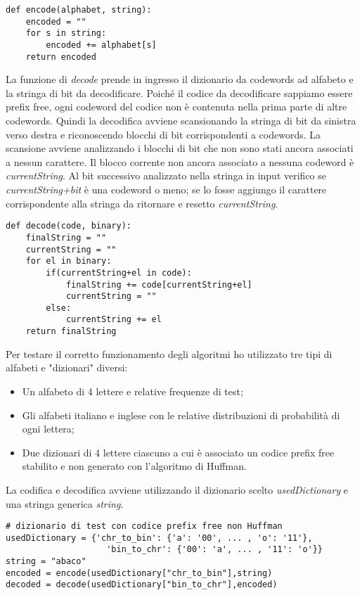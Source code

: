 \documentclass{article}
\begin{document}
\begin{lstlisting}
def encode(alphabet, string):
    encoded = ""
    for s in string:
        encoded += alphabet[s]
    return encoded
\end{lstlisting}
La funzione di \textit{decode} prende in ingresso il dizionario da codewords ad alfabeto e la stringa di bit da decodificare. Poiché il codice da decodificare sappiamo essere prefix free, ogni codeword del codice non è contenuta nella prima parte di altre codewords. Quindi la decodifica avviene scansionando la stringa di bit da sinistra verso destra e riconoscendo blocchi di bit corrispondenti a codewords. La scansione avviene analizzando i blocchi di bit che non sono stati ancora associati a nessun carattere. Il blocco corrente non ancora associato a nessuna codeword è \textit{currentString}. Al bit successivo analizzato nella stringa in input verifico se \textit{currentString+bit} è una codeword o meno; se lo fosse aggiungo il carattere corrispondente alla stringa da ritornare e resetto \textit{currentString}.\\
\begin{lstlisting}
def decode(code, binary):
    finalString = ""
    currentString = ""
    for el in binary:
        if(currentString+el in code):
            finalString += code[currentString+el]
            currentString = ""
        else:
            currentString += el
    return finalString
\end{lstlisting}
Per testare il corretto funzionamento degli algoritmi ho utilizzato tre tipi di alfabeti e "dizionari" diversi:
\begin{itemize}
    \item Un alfabeto di 4 lettere e relative frequenze di test;
    \item Gli alfabeti italiano e inglese con le relative distribuzioni di probabilità di ogni lettera;
    \item Due dizionari di 4 lettere ciascuno a cui è associato un codice prefix free stabilito e non generato con l'algoritmo di Huffman.
\end{itemize}
La codifica e decodifica avviene utilizzando il dizionario scelto \textit{usedDictionary} e una stringa generica \textit{string}.
\begin{lstlisting}
# dizionario di test con codice prefix free non Huffman
usedDictionary = {'chr_to_bin': {'a': '00', ... , 'o': '11'}, 
                    'bin_to_chr': {'00': 'a', ... , '11': 'o'}}
string = "abaco"
encoded = encode(usedDictionary["chr_to_bin"],string)
decoded = decode(usedDictionary["bin_to_chr"],encoded)
\end{lstlisting}    
\end{document}
